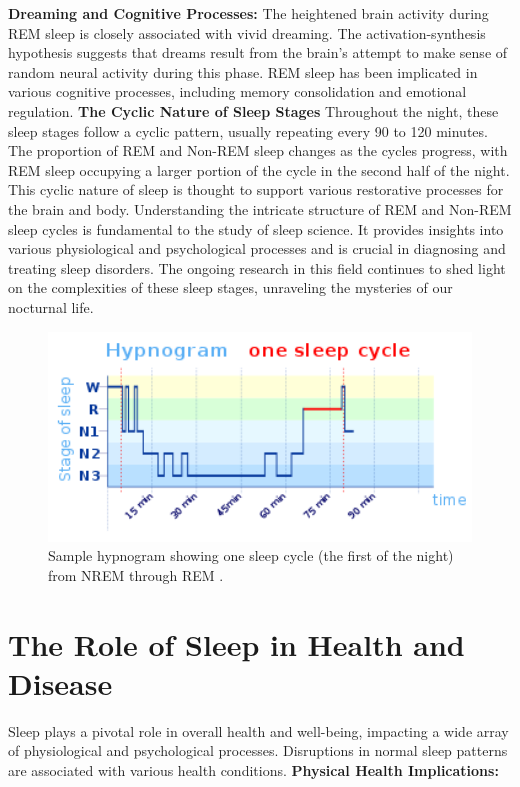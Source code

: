 \documentclass[12pt, a4paper,oneside]{book}
\numberwithin{equation}{section}
\begin{document}
\newline \newline \textbf{Dreaming and Cognitive Processes:} The heightened brain activity during REM sleep is closely associated with vivid dreaming. The activation-synthesis hypothesis suggests that dreams result from the brain's attempt to make sense of random neural activity during this phase. REM sleep has been implicated in various cognitive processes, including memory consolidation and emotional regulation.\cite{Hobson2000}\newline
\textbf{The Cyclic Nature of Sleep Stages}
Throughout the night, these sleep stages follow a cyclic pattern, usually repeating every 90 to 120 minutes. The proportion of REM and Non-REM sleep changes as the cycles progress, with REM sleep occupying a larger portion of the cycle in the second half of the night. This cyclic nature of sleep is thought to support various restorative processes for the brain and body.\cite{Siegel2005}\newline \newline
Understanding the intricate structure of REM and Non-REM sleep cycles is fundamental to the study of sleep science. It provides insights into various physiological and psychological processes and is crucial in diagnosing and treating sleep disorders. The ongoing research in this field continues to shed light on the complexities of these sleep stages, unraveling the mysteries of our nocturnal life.
\begin{figure}[htb]
\centerline{\includegraphics[width=1\textwidth]{sleep cycle.png}}
\caption{Sample hypnogram showing one sleep cycle (the first of the night) from NREM through REM \cite{WikiSleepCycle}.}
\label{fig:A3.1}
\end{figure}
\section{The Role of Sleep in Health and Disease}\label{sec:2.2}
Sleep plays a pivotal role in overall health and well-being, impacting a wide array of physiological and psychological processes. Disruptions in normal sleep patterns are associated with various health conditions.\newline
\textbf{Physical Health Implications:}
\end{document}
